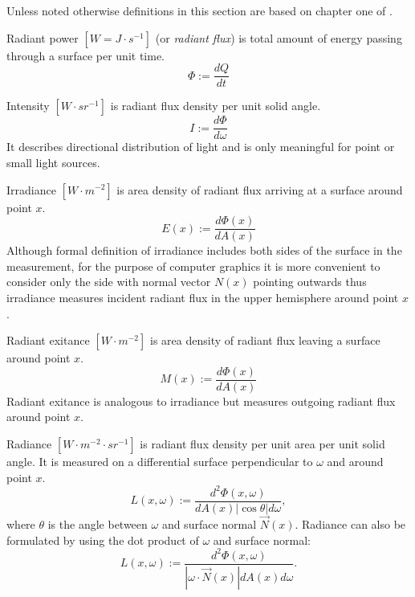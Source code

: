 Unless noted otherwise definitions in this section are based on chapter one of \cite{mccluney94}.

\begin{df}
Radiant power $[W=J \cdot s^{-1}]$ (or \emph{radiant flux}) is total amount of energy passing through a surface per unit time.
\begin{equation}
  \Phi := \frac{dQ}{dt}
\end{equation}
\end{df}

\begin{df}
Intensity $[W \cdot sr^{-1}]$ is radiant flux density per unit solid angle.
\begin{equation}
  I := \frac{d\Phi}{d\omega}
\end{equation}
It describes directional distribution of light and is only meaningful for point or small light sources.
\end{df}

\begin{df}
Irradiance $[W \cdot m^{-2}]$ is  area density of radiant flux arriving at a surface around point $x$.
\begin{equation}
  E(x) := \frac{d\Phi(x)}{dA(x)}
\end{equation}
Although formal definition of irradiance includes both sides of the surface in the measurement, for the purpose of computer graphics it is more convenient to consider only the side with normal vector $N(x)$ pointing outwards thus irradiance measures incident radiant flux in the upper hemisphere around point $x$.
\end{df}

\begin{df}
Radiant exitance $[W \cdot m^{-2}]$ \parencite{nicodemus78} is area density of radiant flux leaving a surface around point $x$.
\begin{equation}
  M(x) := \frac{d\Phi(x)}{dA(x)}
\end{equation}
Radiant exitance is analogous to irradiance but measures outgoing radiant flux around point $x$.
\end{df}

\begin{df}
Radiance $[W \cdot m^{-2} \cdot sr^{-1}]$ is radiant flux density per unit area per unit solid angle. It is measured on a differential surface perpendicular to $\omega$ and around point $x$.
\begin{equation}
  L(x,\omega) := \frac{d^{2}\Phi(x, \omega)}{dA(x) |\cos\theta| d\omega},
\end{equation}
where $\theta$ is the angle between $\omega$ and surface normal $\vec{N}(x)$. Radiance can also be formulated by using the dot product of $\omega$ and surface normal:
\begin{equation}
  L(x, \omega) := \frac{d^{2}\Phi(x, \omega)}{|\omega \cdot \vec{N}(x)| dA(x) d\omega}.
\end{equation}
\end{df}

